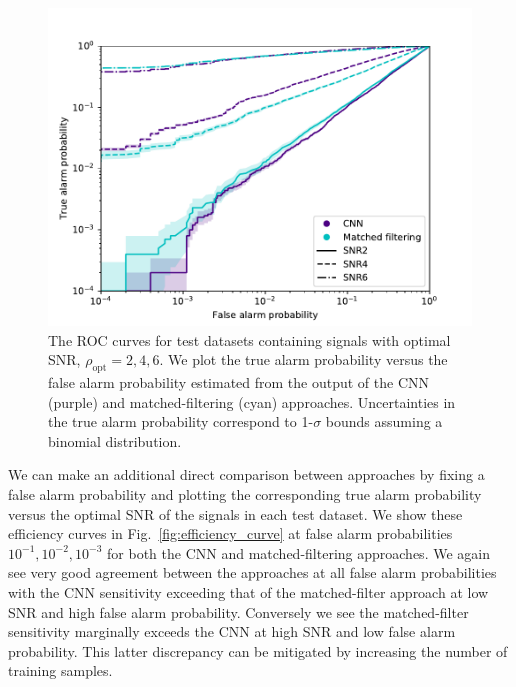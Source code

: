 \documentclass[%
showpacs,
 amsmath,amssymb,
 aps,
 twocolumn,
 prl,
 reprint,
floatfix,
]{revtex4-1}
\begin{document}
%
%
\begin{figure}[]
\includegraphics[width=\columnwidth] {figures/ROC_curves.pdf}
\caption{The \ac{ROC} curves for test datasets containing signals with optimal
\ac{SNR}, $\rho_{\mathrm{opt}}=2,4,6$. We plot the true alarm probability
versus the false alarm probability estimated from the output of the \ac{CNN}
(purple) and matched-filtering (cyan) approaches. Uncertainties in the true
alarm probability correspond to 1-$\sigma$ bounds assuming a binomial
distribution.} \label{fig:ROC_curves} 
\end{figure}

%
%
We can make an additional direct comparison between approaches by fixing a
false alarm probability and plotting the corresponding true alarm probability
versus the optimal \ac{SNR} of the signals in each test dataset. We show these
efficiency curves in Fig.~\ref{fig:efficiency_curve} at false alarm
probabilities $10^{-1},10^{-2},10^{-3}$ for both the \ac{CNN} and
matched-filtering approaches. We again see very good agreement between the
approaches at all false alarm probabilities with the \ac{CNN} sensitivity
exceeding that of the matched-filter approach at low \ac{SNR} and high false
alarm probability. Conversely we see the matched-filter sensitivity marginally
exceeds the \ac{CNN} at high \ac{SNR} and low false alarm probability. This
latter discrepancy can be mitigated by increasing the number of training
samples.

\end{document}
